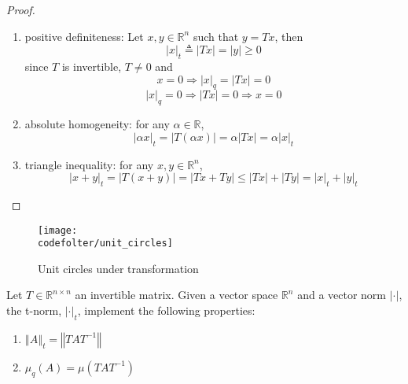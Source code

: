 \documentclass[12pt,English]{article}
\begin{document}
\begin{proof}\hfill
\begin{enumerate}
        \item positive definiteness: Let $x,y\in\mathbb{R}^{n}$ such that $y=Tx$, then $$\left|x\right|_{t}\triangleq\left|Tx\right|=\left|y\right|\geq0$$
        since $T$ is invertible, $T\ne0$ and
        $$x=0 \Rightarrow \left|x\right|_{q}=\left|Tx\right|=0$$
        $$\left|x\right|_{q}=0 \Rightarrow \left|Tx\right|=0 \Rightarrow x=0$$ 
        
        \item absolute homogeneity: for any $\alpha\in\mathbb{R}$, 
        $$\left|\alpha x\right|_{t}=\left|T\left(\alpha x\right)\right| =\alpha\left|Tx\right|=\alpha\left|x\right|_{t}$$
        
        \item triangle inequality: for any $x,y\in\mathbb{R}^{n}$,
        $$\left|x+y\right|_{t}=\left|T\left(x+y\right)\right|=\left|Tx+Ty\right|\leq\left|Tx\right|+\left|Ty\right|=\left|x\right|_{t}+\left|y\right|_{t}$$

    \end{enumerate}
\end{proof}

\begin{figure}[H]
\begin{center}
\texttt{[image: \\codefolter/unit\_circles]}
\end{center}
\caption{Unit circles under transformation}
\end{figure}

\begin{lem}
Let $T\in\mathbb{R}^{n\times n}$ an invertible matrix.
Given a vector space $\mathbb{R}^{n}$ and a vector norm $\left|\cdot\right|$, the t-norm, $\left|\cdot\right|_{t}$, implement the following properties:
\begin{enumerate}
    \item $\left\Vert A\right\Vert _{t}=\left\Vert TAT^{-1}\right\Vert$
    \item $\mu_{q}\left(A\right)=\mu\left(TAT^{-1}\right)$
\end{enumerate}
\end{lem}
\end{document}
